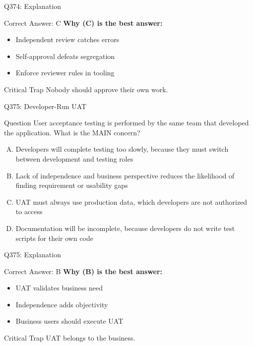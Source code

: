 \documentclass{beamer}
\begin{document}
	\begin{frame}{Q374: Explanation}
		\begin{block}{Correct Answer: C}
			\textbf{Why (C) is the best answer:}
			\begin{itemize}
				\item Independent review catches errors
				\item Self-approval defeats segregation
				\item Enforce reviewer rules in tooling
			\end{itemize}
		\end{block}
		\begin{alertblock}{Critical Trap}
			Nobody should approve their own work.
		\end{alertblock}
	\end{frame}
	
	\begin{frame}{Q375: Developer-Run UAT}
		\begin{block}{Question}
			\small User acceptance testing is performed by the same team that developed the application. What is the MAIN concern?
		\end{block}
		\begin{enumerate}[(A)]
			\footnotesize
			\item Developers will complete testing too slowly, because they must switch between development and testing roles
			\item Lack of independence and business perspective reduces the likelihood of finding requirement or usability gaps
			\item UAT must always use production data, which developers are not authorized to access
			\item Documentation will be incomplete, because developers do not write test scripts for their own code
		\end{enumerate}
	\end{frame}
	
	\begin{frame}{Q375: Explanation}
		\begin{block}{Correct Answer: B}
			\textbf{Why (B) is the best answer:}
			\begin{itemize}
				\item UAT validates business need
				\item Independence adds objectivity
				\item Business users should execute UAT
			\end{itemize}
		\end{block}
		\begin{alertblock}{Critical Trap}
			UAT belongs to the business.
		\end{alertblock}
	\end{frame}
	
\end{document}
